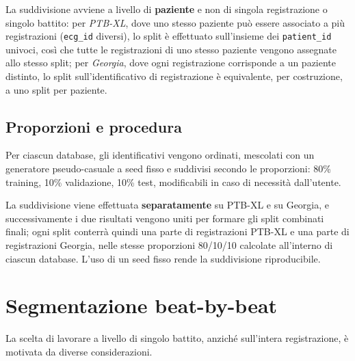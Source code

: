 La suddivisione avviene a livello di \textbf{paziente} e non di singola registrazione o singolo battito: per \emph{PTB-XL}, dove uno stesso paziente può essere associato a più registrazioni (\texttt{ecg\_id} diversi), lo split è effettuato sull'insieme dei \texttt{patient\_id} univoci, così che tutte le registrazioni di uno stesso paziente vengono assegnate allo stesso split; per \emph{Georgia}, dove ogni registrazione corrisponde a un paziente distinto, lo split sull'identificativo di registrazione è equivalente, per costruzione, a uno split per paziente.

\subsection{Proporzioni e procedura}
Per ciascun database, gli identificativi vengono ordinati, mescolati con un generatore pseudo-casuale a seed fisso e suddivisi secondo le proporzioni: 80\% training, 10\% validazione, 10\% test, modificabili in caso di necessità dall'utente.

La suddivisione viene effettuata \textbf{separatamente} su PTB-XL e su Georgia, e successivamente i due risultati vengono uniti per formare gli split combinati finali; ogni split conterrà quindi una parte di registrazioni PTB-XL e una parte di registrazioni Georgia, nelle stesse proporzioni 80/10/10 calcolate all'interno di ciascun database. L'uso di un seed fisso rende la suddivisione riproducibile.

\section{Segmentazione beat-by-beat}
\label{beat-by-beat-segmentation}

La scelta di lavorare a livello di singolo battito, anziché sull'intera registrazione, è motivata da diverse considerazioni.

